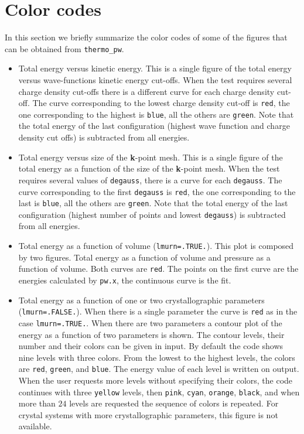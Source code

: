 \documentclass[12pt,a4paper]{article}
\begin{document}
\newpage
\section{\color{coral}Color codes}

In this section we briefly summarize the color codes of some of the figures
that can be obtained from \texttt{thermo\_pw}.

\begin{itemize} 
\item
Total energy versus kinetic energy. This is a single figure of the total
energy versus wave-functions kinetic energy cut-offs. When the test
requires several charge density cut-offs there is a different curve
for each charge density cut-off. The curve corresponding to the lowest
charge density cut-off is \texttt{red}, the one corresponding to the
highest is \texttt{blue}, all the others are \texttt{green}.
Note that the total energy of the last configuration (highest wave function
and charge density cut offs) is subtracted from all energies.

\item
Total energy versus size of the {\bf k}-point mesh. This is a single
figure of the total energy as a function of the size of the {\bf k}-point
mesh. When the test requires several values of \texttt{degauss}, there
is a curve for each \texttt{degauss}. The curve corresponding to the
first \texttt{degauss} is \texttt{red}, the one corresponding to the
last is \texttt{blue}, all the others are \texttt{green}.          
Note that the total energy of the last configuration (highest number of
points and lowest \texttt{degauss}) is subtracted from all energies.

\item
Total energy as a function of volume (\texttt{lmurn=.TRUE.}). 
This plot is composed by two figures. Total energy as a function of volume 
and pressure as a function of volume. Both curves are \texttt{red}.   
The points on the first curve are the energies calculated by 
\texttt{pw.x}, the continuous curve is the fit.

\item
Total energy as a function of one or two crystallographic parameters
(\texttt{lmurn=.FALSE.}). When there is a single parameter the curve is
\texttt{red} as in the case \texttt{lmurn=.TRUE.}. When there are two
parameters a contour plot of the energy as a function of two parameters
is shown. The contour levels, their number and their colors can be
given in input. By default the code shows nine levels with three
colors. From the lowest to the highest levels, the colors are \texttt{red},
\texttt{green}, and \texttt{blue}. The energy value of each level is 
written on output. When the user requests more levels without specifying
their colors, the code continues with three \texttt{yellow} levels, 
then \texttt{pink}, \texttt{cyan}, \texttt{orange}, \texttt{black}, and
when more than $24$ levels are requested the sequence of colors is repeated.
For crystal systems with more crystallographic parameters, this figure is
not available.


\end{itemize}
\end{document}
